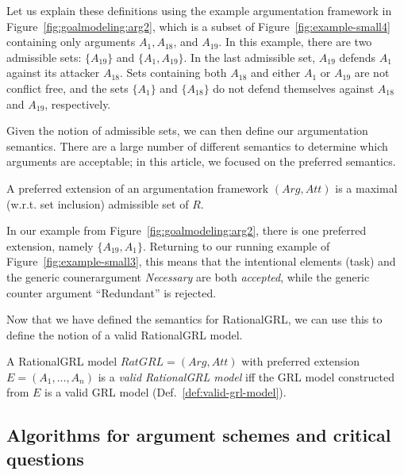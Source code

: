 Let us explain these definitions using the example argumentation framework in Figure~\ref{fig:goalmodeling:arg2}, which is a subset of Figure~\ref{fig:example-small4} containing only arguments $A_1, A_{18}$, and $A_{19}$. In this example, there are two admissible sets: $\{A_{19}\}$ and $\{A_1, A_{19}\}$. In the last admissible set, $A_{19}$ defends $A_1$ against its attacker $A_{18}$. Sets containing both $A_{18}$ and either $A_1$ or $A_{19}$ are not conflict free, and the sets $\{A_1\}$ and $\{A_{18}\}$ do not defend themselves against $A_{18}$ and $A_{19}$, respectively. 

Given the notion of admissible sets, we can then define our argumentation semantics. There are a large number of different semantics to determine which arguments are acceptable; in this article, we focused on the preferred semantics.

\begin{definition} 
\label{def:preferred-semantics}
A preferred extension of an argumentation framework $(Arg,Att)$ is a maximal (w.r.t. set inclusion) admissible set of $R$.
\end{definition}

In our example from Figure~\ref{fig:goalmodeling:arg2}, there is one preferred extension, namely $\{A_{19},A_1\}$. Returning to our running example of Figure~\ref{fig:example-small3}, this means that the intentional elements  (task) and the generic counerargument \emph{Necessary} are both \emph{accepted}, while the generic counter argument ``Redundant'' is rejected.

Now that we have defined the semantics for RationalGRL, we can use this to define the notion of a valid RationalGRL model.

\begin{definition}
\label{def:valid-rationalgrl-model}
A RationalGRL model $RatGRL = (Arg, Att)$ with preferred extension $E=(A_1,\ldots,A_n)$ is a \emph{valid RationalGRL model} iff the GRL model constructed from $E$ is a valid GRL model (Def.~\ref{def:valid-grl-model}).
\end{definition}


\subsection{Algorithms for argument schemes and critical questions}
\label{sect:algorithms}

